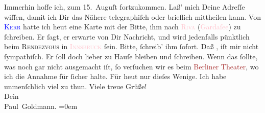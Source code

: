                Immerhin hoffe ich, zum 15. Auguſt fortzukommen. Laß’
               mich Deine Adreſſe wiſſen, damit ich Dir das Nähere telegraphiſch oder brieflich
               mittheilen kann.\pend
           \pstart
           Von \textsc{\textcolor{blue}{Kerr}{}\ledrightnote{\textcolor{blue}{Alfred Kerr}}} hatte ich heut eine Karte mit der Bitte, ihm
               nach \textsc{\textcolor{pink}{Riva}{}\ledrightnote{\textcolor{pink}{Riva del Garda}}} (\textcolor{pink}{Gardaſee}{}\ledrightnote{\textcolor{pink}{Lago di Garda}}) zu {\pb}ſchreiben. Er ſagt, er erwarte von Dir Nachricht,
               und wird jedenfalls pünktlich beim 
                  \textsc{Rendezvous}
                in \textsc{\textcolor{pink}{Innsbruck}{}\ledrightnote{\textcolor{pink}{Innsbruck}}} ſein. \strikeout{\textcolor{gray}{×}\-\textcolor{gray}{×}\-\textcolor{gray}{×}\-\textcolor{gray}{×}\-\textcolor{gray}{×}\-\textcolor{gray}{×}\-\textcolor{gray}{×}\-\textcolor{gray}{×}\-\textcolor{gray}{×}\-\textcolor{gray}{×}\-\textcolor{gray}{×}\-\textcolor{gray}{×}\-\textcolor{gray}{×}\-\textcolor{gray}{×}\-\textcolor{gray}{×}\-\textcolor{gray}{×}} Bitte, ſchreib’ ihm ſofort.\pend
           \pstart
           Daß \label{K_L02924-4v}\label{K_L02924-4h}, iſt
               mir nicht ſympathiſch. Er ſoll doch lieber zu Hauſe bleiben und \label{K_L02924-5v}\label{K_L02924-5h} ſchreiben.\pend
           \pstart
           Wenn das \label{K_L02924-6v}\label{K_L02924-6h} ſollte, was noch gar nicht ausgemacht iſt, ſo verſuchen wir es beim \textcolor{brown}{Berliner Theater}{}\ledrightnote{\textcolor{brown}{Berliner Theater}}, wo ich die Annahme für ſicher
               halte.\pend
           \pstart
           {\pb}Für heut nur dieſes
               Wenige. Ich habe unmenſchlich viel zu thun.\pend
           \pstart
           Viele treue Grüße! {\\[\baselineskip]}Dein {\\[\baselineskip]}\spacefill\mbox{Paul Goldmann.}\pend
           \leftskip=0em{}\endnumbering{}\begin{anhang}\end{anhang}
      